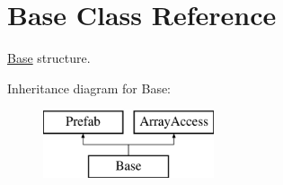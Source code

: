 \hypertarget{class_base}{}\section{Base Class Reference}
\label{class_base}


\hyperlink{class_base}{Base} structure.  


Inheritance diagram for Base\+:\begin{figure}[H]
\begin{center}
\leavevmode
\includegraphics[height=2.000000cm]{class_base}
\end{center}
\end{figure}

